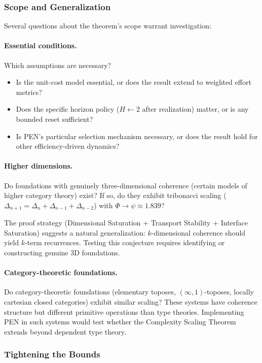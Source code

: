 \documentclass[11pt]{article}
\theoremstyle{definition}
\theoremstyle{remark}
\begin{document}
\subsubsection{Scope and Generalization}

Several questions about the theorem's scope warrant investigation:

\paragraph{Essential conditions.} Which assumptions are necessary?
\begin{itemize}
\item Is the unit-cost model essential, or does the result extend to weighted effort metrics?
\item Does the specific horizon policy ($H \gets 2$ after realization) matter, or is any bounded reset
sufficient?
\item Is PEN's particular selection mechanism necessary, or does the result hold for other efficiency-driven
dynamics?
\end{itemize}

\paragraph{Higher dimensions.} Do foundations with genuinely three-dimensional coherence (certain
models of higher category theory) exist? If so, do they exhibit tribonacci scaling
($\Delta_{n+1} = \Delta_n + \Delta_{n-1} + \Delta_{n-2}$) with $\Phi \to \psi \approx 1.839$?

The proof strategy (Dimensional Saturation + Transport Stability + Interface Saturation) suggests
a natural generalization: $k$-dimensional coherence should yield $k$-term recurrences. Testing this
conjecture requires identifying or constructing genuine 3D foundations.

\paragraph{Category-theoretic foundations.} Do category-theoretic foundations (elementary toposes,
$(\infty,1)$-toposes, locally cartesian closed categories) exhibit similar scaling? These systems have
coherence structure but different primitive operations than type theories. Implementing PEN in
such systems would test whether the Complexity Scaling Theorem extends beyond dependent type
theory.

\subsubsection{Tightening the Bounds}
\end{document}
